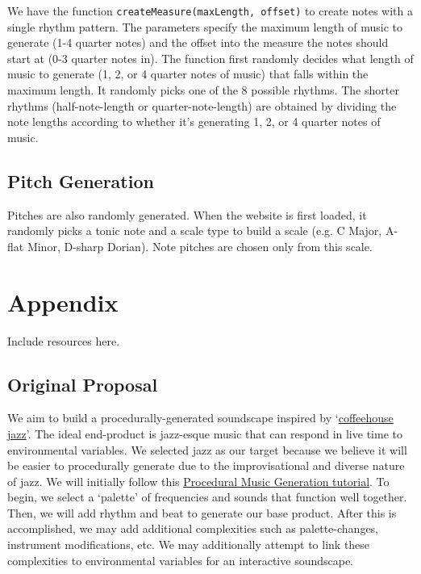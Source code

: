 \documentclass[12pt,a4paper]{article}
\begin{document}
We have the function \texttt{createMeasure(maxLength, offset)} to create notes with a single rhythm pattern. The parameters specify the maximum length of music to generate (1-4 quarter notes) and the offset into the measure the notes should start at (0-3 quarter notes in). The function first randomly decides what length of music to generate (1, 2, or 4 quarter notes of music) that falls within the maximum length. It randomly picks one of the 8 possible rhythms. The shorter rhythms (half-note-length or quarter-note-length) are obtained by dividing the note lengths according to whether it's generating 1, 2, or 4 quarter notes of music.

\subsection{Pitch Generation}

Pitches are also randomly generated. When the website is first loaded, it randomly picks a tonic note and a scale type to build a scale (e.g. C Major, A-flat Minor, D-sharp Dorian). Note pitches are chosen only from this scale. 


\section{Appendix}
Include resources here.

\subsection{Original Proposal}
We aim to build a procedurally-generated soundscape inspired by `\href{https://www.youtube.com/watch?v=K2Q6YO3Ez44}{coffeehouse jazz}'. The ideal end-product is jazz-esque music that can respond in live time to environmental variables. We selected jazz as our target because we believe it will be easier to procedurally generate due to the improvisational and diverse nature of jazz. We will initially follow this \href{http://www.procjam.com/tutorials/en/music/}{Procedural Music Generation tutorial}. To begin, we select a `palette' of frequencies and sounds that function well together. Then, we will add rhythm and beat to generate our base product. After this is accomplished, we may add additional complexities such as palette-changes, instrument modifications, etc. We may additionally attempt to link these complexities to environmental variables for an interactive soundscape.
\end{document}
